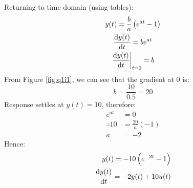 \documentclass[11pt]{article}
\numberwithin{equation}{section}
\begin{document}
Returning to time domain (using tables):
\begin{gather}
    y(t) = \frac{b}{a} \left(e^{at}-1\right) \label{eq:q1i2}\\
    \frac{\dif y(t)}{\dif t} = be^{at}\\
    \left. \frac{\dif y(t)}{\dif t} \right|_{t = 0} = b
\end{gather}
From Figure \ref{fig:q1i1}, we can see that the gradient at 0 is:
\begin{equation}
    b = \frac{10}{0.5} = 20
\end{equation}
Response settles at $y(t) = 10$, therefore:
\begin{align}
    e^{at} &= 0\\
    \therefore 10 &= \frac{20}{a}\left(-1\right)\\
    a &= -2
\end{align}
Hence:
\begin{align}
    y(t) = -10 \left(e^{-2t}-1\right)\\
    \frac{\dif y(t)}{\dif t} = -2y(t) + 10u(t)
\end{align}
\end{document}
